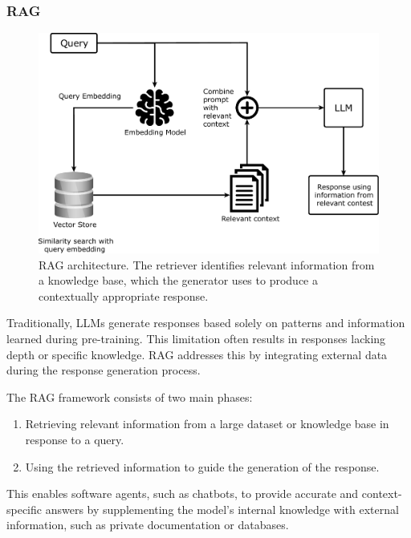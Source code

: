 \subsubsection{\gls{RAG}}
%
\begin{figure}
    \centering
    \includegraphics[width=0.8\linewidth]{figures/rag-architecture}
    \caption{
        \gls{RAG} architecture.
        The retriever identifies relevant information from a knowledge base, which the generator uses to produce a contextually appropriate response.
    }
    \label{fig:rag-architecture}
\end{figure}
%
Traditionally, \glspl{LLM} generate responses based solely on patterns and information learned during pre-training.
%
This limitation often results in responses lacking depth or specific knowledge.
%
\gls{RAG} addresses this by integrating external data during the response generation process.

The \gls{RAG} framework consists of two main phases:
%
\begin{enumerate}
    \item Retrieving relevant information from a large dataset or knowledge base in response to a query.
    \item Using the retrieved information to guide the generation of the response.
\end{enumerate}
%
This enables software agents, such as chatbots, to provide accurate and context-specific answers by supplementing the model's internal knowledge with external information, such as private documentation or databases.


